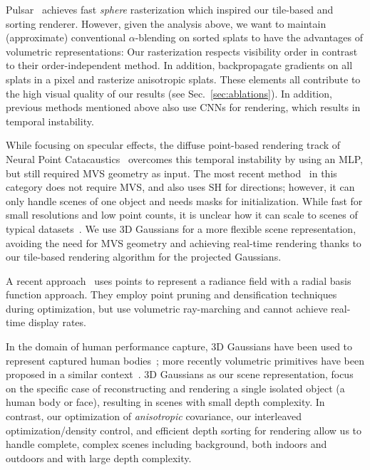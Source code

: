 Pulsar~\cite{Lassner_2021_CVPR} achieves fast \emph{sphere} rasterization which inspired our tile-based and sorting renderer. However, given the analysis above, we want to maintain (approximate) conventional $\alpha$-blending on sorted splats to have the advantages of volumetric representations: Our rasterization respects visibility order in contrast to their order-independent method. In addition, 
 backpropagate gradients on all splats in a pixel and rasterize anisotropic splats.
These elements all contribute to the high visual quality of our results (see Sec.~\ref{sec:ablations}).
In addition, 
previous methods mentioned above
also use CNNs for rendering, which results in temporal instability.

While focusing on specular effects, the diffuse point-based rendering track of Neural Point Catacaustics~\cite{kopanas22} overcomes this temporal instability by using an MLP, but still required MVS geometry as input.
The most recent method~\cite{zhang2022} in this category does not require MVS, and also uses SH for directions; however, it can only handle scenes of one object and needs masks for initialization. While fast for small resolutions and low point counts, it is unclear how it can scale to scenes of typical datasets~\cite{knapitsch2017tanks,hedman2018deep,barron2022mipnerf360}.
We use 3D Gaussians for a more flexible scene representation, avoiding the need for MVS geometry and achieving real-time rendering thanks to our tile-based rendering algorithm for the projected Gaussians.





A recent approach~\cite{xu2022point} uses points to represent a radiance field with a radial basis function approach. They employ point pruning and densification techniques during optimization, but use volumetric ray-marching and cannot achieve real-time display rates. %


In the domain of human performance capture, 3D Gaussians have been used to represent captured human bodies~\cite{stoll2011fast,rhodin2015versatile}; more recently   volumetric primitives have been proposed in a similar context~\cite{lombardi2021mixture}.  3D Gaussians as our scene representation,  focus on the specific case of reconstructing and rendering a single isolated object (a human body or face), resulting in scenes with small depth complexity. In contrast, our optimization of \emph{anisotropic} covariance, our interleaved optimization/density control, and efficient depth sorting for rendering allow us to handle complete, complex scenes including background, both indoors and outdoors and with large depth complexity.
